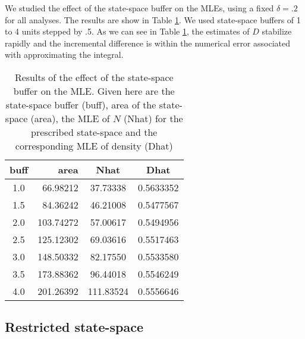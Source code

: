 We studied the effect of the state-space buffer on the MLEs,
using a fixed $\delta = .2$ for all analyses. The results are show in Table \ref{mle.tab.buff}. 
We used state-space buffers
of 1 to 4 units stepped by .5. As we can see in Table \ref{mle.tab.buff}, 
the estimates of $D$ stabilize rapidly and the incremental difference
is within the numerical error associated with approximating the
integral.  

\begin{table}[ht]
\centering
\caption{Results of the effect of the state-space buffer on the MLE. 
Given here are the state-space buffer (buff), area of the state-space (area), the
MLE of $N$ (Nhat) for the prescribed state-space and the corresponding MLE of
density (Dhat)}
\begin{tabular}{crcc}
\hline \hline
buff    & area & Nhat & Dhat \\ \hline
 1.0 & 66.98212 & 37.73338 & 0.5633352  \\
 1.5 & 84.36242 & 46.21008 & 0.5477567  \\
 2.0 &103.74272 & 57.00617 & 0.5494956  \\
 2.5 &125.12302 & 69.03616 & 0.5517463  \\
 3.0 &148.50332 & 82.17550 & 0.5533580  \\ 
 3.5 &173.88362 & 96.44018 & 0.5546249  \\
 4.0 &201.26392 &111.83524 & 0.5556646  \\  \hline
\end{tabular}
\label{mle.tab.buff}
\end{table}


\subsection{Restricted state-space}
\label{mle.sec.shapefile}

